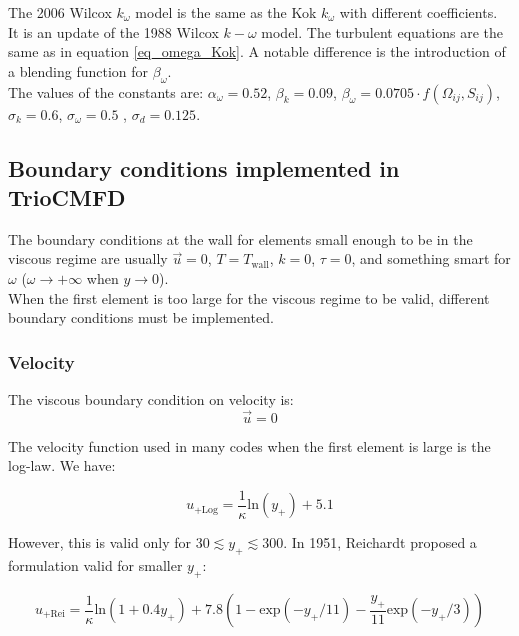 The 2006 Wilcox $k_\omega$ model \cite{Wilcox2006} is the same as the Kok $k_\omega$ with different coefficients. It is an update of the 1988 Wilcox $k-\omega$ model. The turbulent equations are the same as in equation \ref{eq_omega_Kok}. A notable difference is the introduction of a blending function for $\beta_{\omega}$. \\

The values of the constants are: $\alpha_{\omega} = 0.52$, $\beta_{k} = 0.09$, $\beta_{\omega} = 0.0705\cdot f(\Omega_{ij},S_{ij})$, $\sigma_k = 0.6$, $\sigma_{\omega} = 0.5$ , $\sigma_d = 0.125$.

\subsection{Boundary conditions implemented in TrioCMFD}

The boundary conditions at the wall for elements small enough to be in the viscous regime are usually $\overrightarrow{u} = 0$, $T = T_{\text{wall}}$, $k=0$, $\tau = 0$, and something smart for $\omega$ ($\omega \rightarrow +\infty$ when $y\rightarrow0$).\\

When the first element is too large for the viscous regime to be valid, different boundary conditions must be implemented. 

\subsubsection{Velocity}

The viscous boundary condition on velocity is:
\begin{equation} \label{velocity_0}
	\overrightarrow{u} = 0
\end{equation}

The velocity function used in many codes when the first element is large is the log-law. We have:

\begin{equation}
	u_{+\text{Log}} = \frac{1}{\kappa}\text{ln}(y_+) + 5.1
\end{equation}

However, this is valid only for $30 \lesssim y_+ \lesssim 300$. In 1951, Reichardt \cite{Reichardt1951} proposed a formulation valid for smaller $y_+$:

\begin{equation}
	u_{+\text{Rei}} = \frac{1}{\kappa}\text{ln}(1+0.4y_+) + 7.8\left(1-\text{exp}(-y_+/11)-\frac{y_+}{11}\text{exp}(-y_+/3)\right)
\end{equation}

